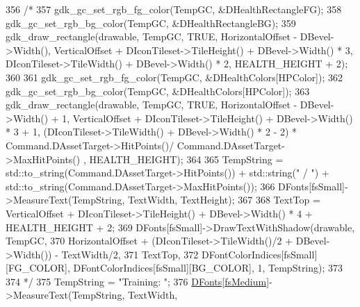 \begin{DoxyCode}
356                                 \textcolor{comment}{/*}
357 \textcolor{comment}{                                gdk\_gc\_set\_rgb\_fg\_color(TempGC, &DHealthRectangleFG);}
358 \textcolor{comment}{                                gdk\_gc\_set\_rgb\_bg\_color(TempGC, &DHealthRectangleBG);}
359 \textcolor{comment}{                                gdk\_draw\_rectangle(drawable, TempGC, TRUE, HorizontalOffset -
       DBevel->Width(), VerticalOffset + DIconTileset->TileHeight() + DBevel->Width() * 3,  DIconTileset->TileWidth() +
       DBevel->Width() * 2, HEALTH\_HEIGHT + 2);}
360 \textcolor{comment}{                                }
361 \textcolor{comment}{                                gdk\_gc\_set\_rgb\_fg\_color(TempGC, &DHealthColors[HPColor]);}
362 \textcolor{comment}{                                gdk\_gc\_set\_rgb\_bg\_color(TempGC, &DHealthColors[HPColor]);}
363 \textcolor{comment}{                                gdk\_draw\_rectangle(drawable, TempGC, TRUE, HorizontalOffset -
       DBevel->Width() + 1, VerticalOffset + DIconTileset->TileHeight() + DBevel->Width() * 3 + 1,  (DIconTileset->TileWidth() +
       DBevel->Width() * 2 - 2) * Command.DAssetTarget->HitPoints()/ Command.DAssetTarget->MaxHitPoints() ,
       HEALTH\_HEIGHT);}
364 \textcolor{comment}{                                }
365 \textcolor{comment}{                                TempString = std::to\_string(Command.DAssetTarget->HitPoints()) +
       std::string(" / ") + std::to\_string(Command.DAssetTarget->MaxHitPoints());}
366 \textcolor{comment}{                                DFonts[fsSmall]->MeasureText(TempString, TextWidth, TextHeight);}
367 \textcolor{comment}{                                }
368 \textcolor{comment}{                                TextTop = VerticalOffset + DIconTileset->TileHeight() + DBevel->Width() * 4
       + HEALTH\_HEIGHT + 2;}
369 \textcolor{comment}{                                DFonts[fsSmall]->DrawTextWithShadow(drawable, TempGC, }
370 \textcolor{comment}{                                    HorizontalOffset + (DIconTileset->TileWidth()/2 + DBevel->Width()) -
       TextWidth/2, }
371 \textcolor{comment}{                                    TextTop, }
372 \textcolor{comment}{                                    DFontColorIndices[fsSmall][FG\_COLOR],
       DFontColorIndices[fsSmall][BG\_COLOR], 1, TempString);}
373 \textcolor{comment}{                                }
374 \textcolor{comment}{                                */}
375                                 TempString = \textcolor{stringliteral}{"Training: "};
376                                 \hyperlink{classCUnitDescriptionRenderer_a270a545ecdb1602cd2a0a2def8997dc8}{DFonts}[\hyperlink{classCUnitDescriptionRenderer_a3ea4cd83b6dd9533ab3abb953a7da35aa7b5aa12d8a01b317ebfbf1bd65d7e568}{fsMedium}]->MeasureText(TempString, TextWidth, 

\end{DoxyCode}
